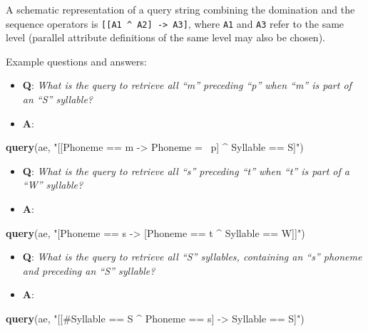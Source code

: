 \documentclass[]{book}
\newenvironment{Shaded}{\begin{snugshade}}{\end{snugshade}}
\newcommand{\KeywordTok}[1]{\textcolor[rgb]{0.13,0.29,0.53}{\textbf{#1}}}
\newcommand{\NormalTok}[1]{#1}
\newcommand{\StringTok}[1]{\textcolor[rgb]{0.31,0.60,0.02}{#1}}
\providecommand{\tightlist}{%
  \setlength{\itemsep}{0pt}\setlength{\parskip}{0pt}}
\begin{document}
A schematic representation of a query string combining the domination and the sequence operators is \texttt{{[}{[}A1\ \^{}\ A2{]}\ -\textgreater{}\ A3{]}}, where \texttt{A1} and \texttt{A3} refer to the same level (parallel attribute definitions of the same level may also be chosen).

Example questions and answers:

\begin{itemize}
\tightlist
\item
  \textbf{Q}: \emph{What is the query to retrieve all ``m'' preceding ``p'' when ``m'' is part of an ``S'' syllable?}
\item
  \textbf{A}:
\end{itemize}

\begin{Shaded}
\begin{Highlighting}[]
\KeywordTok{query}\NormalTok{(ae, }\StringTok{"[[Phoneme == m -> Phoneme =~ p] ^ Syllable == S]"}\NormalTok{)}
\end{Highlighting}
\end{Shaded}

\begin{itemize}
\tightlist
\item
  \textbf{Q}: \emph{What is the query to retrieve all ``s'' preceding ``t'' when ``t'' is part of a ``W'' syllable?}
\item
  \textbf{A}:
\end{itemize}

\begin{Shaded}
\begin{Highlighting}[]
\KeywordTok{query}\NormalTok{(ae, }\StringTok{"[Phoneme == s -> [Phoneme == t ^ Syllable == W]]"}\NormalTok{)}
\end{Highlighting}
\end{Shaded}

\begin{itemize}
\tightlist
\item
  \textbf{Q}: \emph{What is the query to retrieve all ``S'' syllables, containing an ``s'' phoneme and preceding an ``S'' syllable?}
\item
  \textbf{A}:
\end{itemize}

\begin{Shaded}
\begin{Highlighting}[]
\KeywordTok{query}\NormalTok{(ae, }\StringTok{"[[#Syllable == S ^ Phoneme == s] -> Syllable == S]"}\NormalTok{)}
\end{Highlighting}
\end{Shaded}
\end{document}
